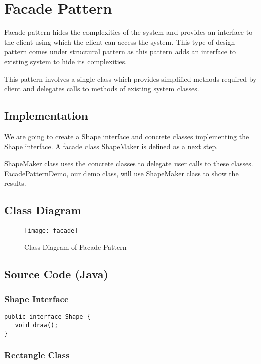 \newpage
\section{Facade Pattern}

Facade pattern hides the complexities of the system and provides an interface to the client using which the client can access the system. This type of design pattern comes under structural pattern as this pattern adds an interface to existing system to hide its complexities.

This pattern involves a single class which provides simplified methods required by client and delegates calls to methods of existing system classes.

\subsection{Implementation}

We are going to create a Shape interface and concrete classes implementing the Shape interface. A facade class ShapeMaker is defined as a next step.

ShapeMaker class uses the concrete classes to delegate user calls to these classes. FacadePatternDemo, our demo class, will use ShapeMaker class to show the results.

\subsection{Class Diagram}

\begin{figure}[h]
\centering
\texttt{[image: facade]}
\caption{Class Diagram of Facade Pattern}
\end{figure}

\newpage
\subsection{Source Code (Java)}

\subsubsection{Shape Interface}

\begin{verbatim}
public interface Shape {
   void draw();
}
\end{verbatim}

\subsubsection{Rectangle Class}

